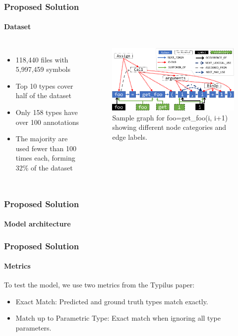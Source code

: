 \documentclass[aspectratio=169]{beamer}
\begin{document}
    \begin{frame}
        \frametitle{Proposed Solution}
        \framesubtitle{Dataset}
        \begin{columns}
            \begin{itemize}
                \item 118,440 files with 5,997,459 symbols
                \item Top 10 types cover half of the dataset
                \item Only 158 types have over 100 annotations
                \item The majority are used fewer than 100 times each, forming 32\% of the dataset
            \end{itemize}
            \begin{figure}
                \includegraphics[width=\columnwidth]{figures/samplegraph.pdf}
                \caption{Sample graph for foo=get\_foo(i, i+1) showing different node categories and edge labels.}
                \label{fig:samplegraph}
            \end{figure}
        \end{columns}
    \end{frame}

    \begin{frame}
        \frametitle{Proposed Solution}
        \framesubtitle{Model architecture}
        \begin{figure}
            \resizebox{\textwidth}{!}{}
            \label{fig:model}
        \end{figure}
    \end{frame}

    \begin{frame}
        \frametitle{Proposed Solution}
        \framesubtitle{Metrics}

        To test the model, we use two metrics from the Typilus paper:

        \begin{itemize}
            \item Exact Match: Predicted and ground truth types match exactly.
            \item Match up to Parametric Type: Exact match when ignoring all type parameters.
        \end{itemize}
    \end{frame}
\end{document}
